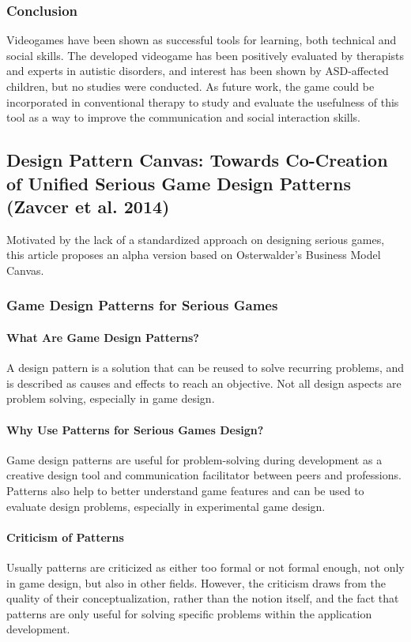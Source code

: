 \documentclass[runningheads]{llncs}
\begin{document}
\subsubsection{Conclusion}
\par Videogames have been shown as successful tools for learning, both technical and social skills. The developed videogame has been positively evaluated by therapists and experts in autistic disorders, and interest has been shown by ASD-affected children, but no studies were conducted. As future work, the game could be incorporated in conventional therapy to study and evaluate the usefulness of this tool as a way to improve the communication and social interaction skills.

\subsection{Design Pattern Canvas: Towards Co-Creation of Unified Serious Game Design Patterns (Zavcer et al. 2014)} 
\par Motivated by the lack of a standardized approach on designing serious games, this article proposes an alpha version based on Osterwalder's Business Model Canvas.
\subsubsection{Game Design Patterns for Serious Games}
\paragraph{What Are Game Design Patterns?} A design pattern is a solution that can be reused to solve recurring problems, and is described as causes and effects to reach an objective. Not all design aspects are problem solving, especially in game design.
\paragraph{Why Use Patterns for Serious Games Design?} Game design patterns are useful for problem-solving during development as a creative design tool and communication facilitator between peers and professions. Patterns also help to better understand game features and can be used to evaluate design problems, especially in experimental game design.
\paragraph{Criticism of Patterns} Usually patterns are criticized as either too formal or not formal enough, not only in game design, but also in other fields. However, the criticism draws from the quality of their conceptualization, rather than the notion itself, and the fact that patterns are only useful for solving specific problems within the application development.
\end{document}
